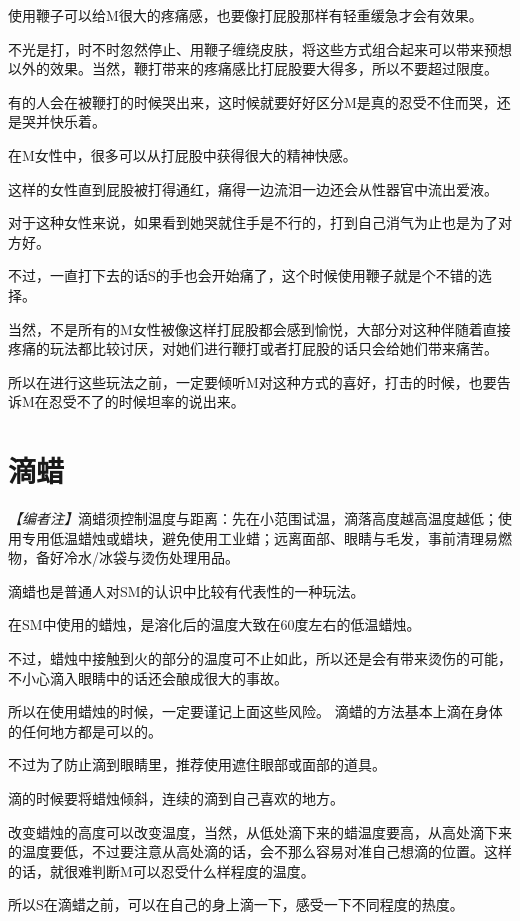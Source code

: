 \documentclass[12pt,UTF8]{ctexbook}
\begin{document}
使用鞭子可以给M很大的疼痛感，也要像打屁股那样有轻重缓急才会有效果。

不光是打，时不时忽然停止、用鞭子缠绕皮肤，将这些方式组合起来可以带来预想以外的效果。当然，鞭打带来的疼痛感比打屁股要大得多，所以不要超过限度。

有的人会在被鞭打的时候哭出来，这时候就要好好区分M是真的忍受不住而哭，还是哭并快乐着。

在M女性中，很多可以从打屁股中获得很大的精神快感。

这样的女性直到屁股被打得通红，痛得一边流泪一边还会从性器官中流出爱液。

对于这种女性来说，如果看到她哭就住手是不行的，打到自己消气为止也是为了对方好。

不过，一直打下去的话S的手也会开始痛了，这个时候使用鞭子就是个不错的选择。

当然，不是所有的M女性被像这样打屁股都会感到愉悦，大部分对这种伴随着直接疼痛的玩法都比较讨厌，对她们进行鞭打或者打屁股的话只会给她们带来痛苦。

所以在进行这些玩法之前，一定要倾听M对这种方式的喜好，打击的时候，也要告诉M在忍受不了的时候坦率的说出来。

\section{滴蜡}

\noindent\textit{【编者注】}滴蜡须控制温度与距离：先在小范围试温，滴落高度越高温度越低；使用专用低温蜡烛或蜡块，避免使用工业蜡；远离面部、眼睛与毛发，事前清理易燃物，备好冷水/冰袋与烫伤处理用品。

滴蜡也是普通人对SM的认识中比较有代表性的一种玩法。

在SM中使用的蜡烛，是溶化后的温度大致在60度左右的低温蜡烛。

不过，蜡烛中接触到火的部分的温度可不止如此，所以还是会有带来烫伤的可能，不小心滴入眼睛中的话还会酿成很大的事故。

所以在使用蜡烛的时候，一定要谨记上面这些风险。 滴蜡的方法基本上滴在身体的任何地方都是可以的。

不过为了防止滴到眼睛里，推荐使用遮住眼部或面部的道具。

滴的时候要将蜡烛倾斜，连续的滴到自己喜欢的地方。

改变蜡烛的高度可以改变温度，当然，从低处滴下来的蜡温度要高，从高处滴下来的温度要低，不过要注意从高处滴的话，会不那么容易对准自己想滴的位置。这样的话，就很难判断M可以忍受什么样程度的温度。

所以S在滴蜡之前，可以在自己的身上滴一下，感受一下不同程度的热度。
\end{document}
